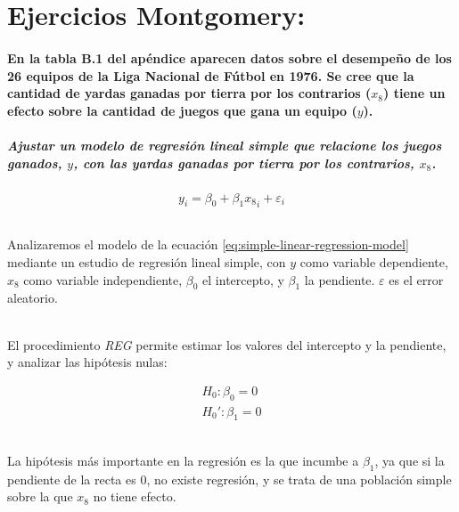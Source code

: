 \documentclass{article}
\begin{document}
  \part{Ejercicios Montgomery:}

  \setcounter{section}{2}
  \subsection{En la tabla B.1 del apéndice aparecen datos sobre el desempeño de los 26 equipos de la Liga Nacional de Fútbol en 1976. Se cree que la cantidad de yardas ganadas por tierra por los contrarios ($x_8$) tiene un efecto sobre la cantidad de juegos que gana un equipo ($y$).}
  \subsubsection{Ajustar un modelo de regresión lineal simple que relacione los juegos ganados, $y$, con las yardas ganadas por tierra por los contrarios, $x_8$.}

  \begin{equation}
  \label{eq:simple-linear-regression-model}
    y_i = \beta_0 + \beta_1{x_8}_i + \varepsilon_i
  \end{equation}
  \paragraph{}
  Analizaremos el modelo de la ecuación \ref{eq:simple-linear-regression-model} mediante un estudio de regresión lineal simple, con $y$ como variable dependiente, $x_8$ como variable independiente, $\beta_0$ el intercepto, y $\beta_1$ la pendiente. $\varepsilon$ es el error aleatorio.

  \paragraph{}
  El procedimiento \textit{REG} permite estimar los valores del intercepto y la pendiente, y analizar las hipótesis nulas:

    \begin{align}
      H_0: \beta_0 = 0\\
      H_0': \beta_1 = 0
      \label{mont:hipotesisnulas}
    \end{align}

  \paragraph{}
  La hipótesis más importante en la regresión es la que incumbe a $\beta_1$, ya que si la pendiente de la recta es 0, no existe regresión, y se trata de una población simple sobre la que $x_8$ no tiene efecto.
\end{document}
